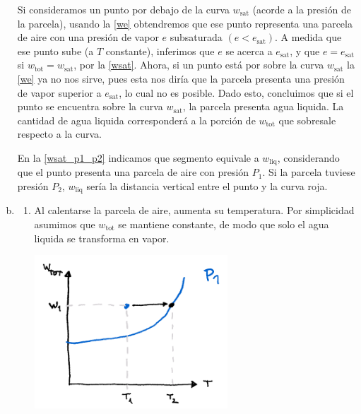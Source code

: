 \documentclass[../main.tex]{subfiles}
\begin{document}
\begin{enumerate}[a)]
Si consideramos un punto por debajo de la curva $w_\text{sat}$ (acorde a la presión de la parcela), usando la \autoref{we} obtendremos que ese punto representa una parcela de aire con una presión de vapor $e$ subsaturada $(e < e_\text{sat})$. A medida que ese punto sube (a $T$ constante), inferimos que $e$ se acerca a $e_\text{sat}$, y que $e = e_\text{sat}$ si $w_\text{tot} = w_\text{sat}$, por la \autoref{wsat}. Ahora, si un punto está por sobre la curva $w_\text{sat}$ la \autoref{we} ya no nos sirve, pues esta nos diría que la parcela presenta una presión de vapor superior a $e_\text{sat}$, lo cual no es posible. Dado esto, concluimos que si el punto se encuentra sobre la curva $w_\text{sat}$, la parcela presenta agua liquida. La cantidad de agua liquida corresponderá a la porción de $w_\text{tot}$ que sobresale respecto a la curva. 

En la \autoref{wsat_p1_p2} indicamos que segmento equivale a $w_\text{liq}$, considerando que el punto presenta una parcela de aire con presión $P_1$. Si la parcela tuviese presión $P_2$, $w_\text{liq}$ sería la distancia vertical entre el punto y la curva roja.

\item 
    \begin{enumerate}
        \item Al calentarse la parcela de aire, aumenta su temperatura. Por simplicidad asumimos que $w_\text{tot}$ se mantiene constante, de modo que solo el agua liquida se transforma en vapor.\par
            \begin{minipage}{\linewidth}
                \centering
                \includegraphics[width=0.6\textwidth]{img/procesoA}
                \label{fig:pA}
            \end{minipage}\\


\end{enumerate}
\end{enumerate}
\end{document}

